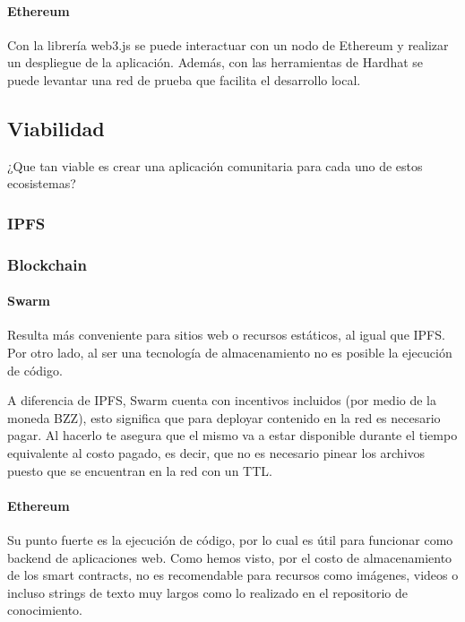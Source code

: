 \paragraph{Ethereum}
Con la librería web3.js se puede interactuar con un nodo de Ethereum y realizar un despliegue de la aplicación. Además, con las herramientas de Hardhat se puede levantar una red de prueba que facilita el desarrollo local.

\subsection{Viabilidad} 

¿Que tan viable es crear una aplicación comunitaria para cada uno de estos ecosistemas?

\subsubsection{IPFS}

\subsubsection{Blockchain}

\paragraph{Swarm}
Resulta más conveniente para sitios web o recursos estáticos, al igual que IPFS. Por otro lado, al ser una tecnología de almacenamiento no es posible la ejecución de código. 

A diferencia de IPFS, Swarm cuenta con incentivos incluidos (por medio de la moneda BZZ), esto significa que para deployar contenido en la red es necesario pagar. Al hacerlo te asegura que el mismo va a estar disponible durante el tiempo equivalente al costo pagado, es decir, que no es necesario pinear los archivos puesto que se encuentran en la red con un TTL.

\paragraph{Ethereum}
Su punto fuerte es la ejecución de código, por lo cual es útil para funcionar como backend de aplicaciones web. Como hemos visto, por el costo de almacenamiento de los smart contracts, no es recomendable para recursos como imágenes, videos o incluso strings de texto muy largos como lo realizado en el repositorio de conocimiento. 


